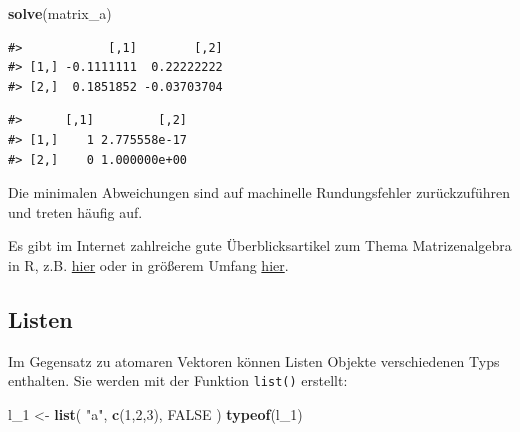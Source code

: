 \documentclass[]{book}
\newenvironment{Shaded}{\begin{snugshade}}{\end{snugshade}}
\newcommand{\KeywordTok}[1]{\textcolor[rgb]{0.13,0.29,0.53}{\textbf{#1}}}
\newcommand{\DecValTok}[1]{\textcolor[rgb]{0.00,0.00,0.81}{#1}}
\newcommand{\StringTok}[1]{\textcolor[rgb]{0.31,0.60,0.02}{#1}}
\newcommand{\OtherTok}[1]{\textcolor[rgb]{0.56,0.35,0.01}{#1}}
\newcommand{\OperatorTok}[1]{\textcolor[rgb]{0.81,0.36,0.00}{\textbf{#1}}}
\newcommand{\NormalTok}[1]{#1}
\begin{document}
\begin{Shaded}
\begin{Highlighting}[]
\KeywordTok{solve}\NormalTok{(matrix_a)}
\end{Highlighting}
\end{Shaded}

\begin{verbatim}
#>            [,1]        [,2]
#> [1,] -0.1111111  0.22222222
#> [2,]  0.1851852 -0.03703704
\end{verbatim}

\begin{Shaded}
\end{Shaded}

\begin{verbatim}
#>      [,1]         [,2]
#> [1,]    1 2.775558e-17
#> [2,]    0 1.000000e+00
\end{verbatim}

Die minimalen Abweichungen sind auf machinelle Rundungsfehler
zurückzuführen und treten häufig auf.

Es gibt im Internet zahlreiche gute Überblicksartikel zum Thema
Matrizenalgebra in R, z.B.
\href{https://www.statmethods.net/advstats/matrix.html}{hier} oder in
größerem Umfang
\href{https://www.math.uh.edu/~jmorgan/Math6397/day13/LinearAlgebraR-Handout.pdf}{hier}.

\subsection{Listen}\label{listen}

Im Gegensatz zu atomaren Vektoren können Listen Objekte verschiedenen
Typs enthalten. Sie werden mit der Funktion \texttt{list()} erstellt:

\begin{Shaded}
\begin{Highlighting}[]
\NormalTok{l_}\DecValTok{1}\NormalTok{ <-}\StringTok{ }\KeywordTok{list}\NormalTok{(}
  \StringTok{"a"}\NormalTok{,}
  \KeywordTok{c}\NormalTok{(}\DecValTok{1}\NormalTok{,}\DecValTok{2}\NormalTok{,}\DecValTok{3}\NormalTok{),}
  \OtherTok{FALSE}
\NormalTok{)}
\KeywordTok{typeof}\NormalTok{(l_}\DecValTok{1}\NormalTok{)}
\end{Highlighting}
\end{Shaded}
\end{document}
